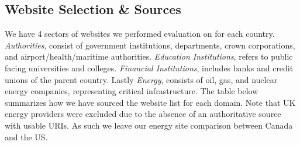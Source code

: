 \documentclass[pdflatex,sn-mathphys-num]{sn-jnl}
\numberwithin{equation}{section}
\theoremstyle{thmstyleone}
\theoremstyle{thmstyletwo}%
\theoremstyle{thmstylethree}%
\begin{document}



\subsection{Website Selection \& Sources}

We have 4 sectors of websites we performed evaluation on for each country. \emph{Authorities}, consist of government 
institutions, departments, crown corporations, and airport/health/maritime authorities. 
\emph{Education Institutions}, refers to public facing universities and colleges. \emph{Financial Institutions}, 
includes banks and credit unions of the parent country. Lastly \emph{Energy}, consists of oil, gas, and nuclear energy companies, representing 
critical infrastructure. The table below summarizes how we have sourced the website list for each domain. 
Note that UK energy providers were excluded due to the absence of an authoritative source 
with usable URIs. As such we leave our energy site comparison between Canada and the US.
\end{document}
